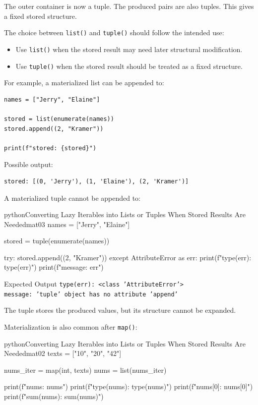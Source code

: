 The outer container is now a tuple. The produced pairs are also tuples. This gives a fixed stored structure.

The choice between \texttt{list()} and \texttt{tuple()} should follow the intended use:

\begin{itemize}
    \item Use \texttt{list()} when the stored result may need later structural modification.
    \item Use \texttt{tuple()} when the stored result should be treated as a fixed structure.
\end{itemize}

For example, a materialized list can be appended to:

\begin{verbatim}
names = ["Jerry", "Elaine"]

stored = list(enumerate(names))
stored.append((2, "Kramer"))

print(f"stored: {stored}")
\end{verbatim}

Possible output:

\begin{verbatim}
stored: [(0, 'Jerry'), (1, 'Elaine'), (2, 'Kramer')]
\end{verbatim}

A materialized tuple cannot be appended to:

\begin{codebox}[]{python}{Converting Lazy Iterables into Lists or Tuples When Stored Results Are Needed}{mat03}
names = ["Jerry", "Elaine"]

stored = tuple(enumerate(names))

try:
    stored.append((2, "Kramer"))
except AttributeError as err:
    print(f"type(err): {type(err)}")
    print(f"message: {err}")
\end{codebox}


\begin{iobox}{Expected Output}
\texttt{type(err): <class 'AttributeError'>} \\
\texttt{message: 'tuple' object has no attribute 'append'} \\
\end{iobox}


The tuple stores the produced values, but its structure cannot be expanded.

Materialization is also common after \texttt{map()}:

\begin{codebox}[]{python}{Converting Lazy Iterables into Lists or Tuples When Stored Results Are Needed}{mat02}
texts = ["10", "20", "42"]

nums_iter = map(int, texts)
nums = list(nums_iter)

print(f"nums: {nums}")
print(f"type(nums): {type(nums)}")
print(f"nums[0]: {nums[0]}")
print(f"sum(nums): {sum(nums)}")
\end{codebox}


